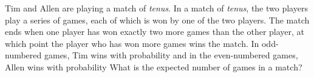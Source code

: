 Tim and Allen are playing a match of \textit{tenus}.  In a match of \textit{tenus}, the two players play a series of games, each of which is won by one of the two players. The match ends when one player has won exactly two more games than the other player, at which point the player who has won more games wins the match. In odd-numbered games, Tim wins with probability  and in the even-numbered games, Allen wins with probability   What is the expected number of games in a match?